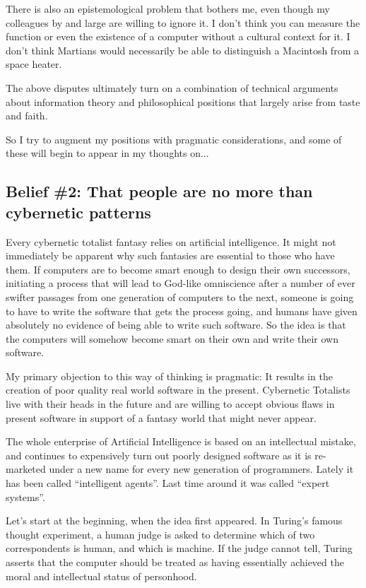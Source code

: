 \documentclass[letterpaper,12pt,english]{sphinxmanual}
\begin{document}
There is also an epistemological problem that bothers me, even though my colleagues by and large are willing to ignore it. I don't think you can measure the function or even the existence of a computer without a cultural context for it. I don't think Martians would necessarily be able to distinguish a Macintosh from a space heater.

The above disputes ultimately turn on a combination of technical arguments about information theory and philosophical positions that largely arise from taste and faith.

So I try to augment my positions with pragmatic considerations, and some of these will begin to appear in my thoughts on...


\subsection{Belief \#2: \textbf{That people are no more than cybernetic patterns}}
\label{lanier:belief-2-that-people-are-no-more-than-cybernetic-patterns}
Every cybernetic totalist fantasy relies on artificial intelligence. It might not immediately be apparent why such fantasies are essential to those who have them. If computers are to become smart enough to design their own successors, initiating a process that will lead to God-like omniscience after a number of ever swifter passages from one generation of computers to the next, someone is going to have to write the software that gets the process going, and humans have given absolutely no evidence of being able to write such software. So the idea is that the computers will somehow become smart on their own and write their own software.

My primary objection to this way of thinking is pragmatic: It results in the creation of poor quality real world software in the present. Cybernetic Totalists live with their heads in the future and are willing to accept obvious flaws in present software in support of a fantasy world that might never appear.

The whole enterprise of Artificial Intelligence is based on an intellectual mistake, and continues to expensively turn out poorly designed software as it is re-marketed under a new name for every new generation of programmers. Lately it has been called ``intelligent agents''. Last time around it was called ``expert systems''.

Let's start at the beginning, when the idea first appeared. In Turing's famous thought experiment, a human judge is asked to determine which of two correspondents is human, and which is machine. If the judge cannot tell, Turing asserts that the computer should be treated as having essentially achieved the moral and intellectual status of personhood.
\end{document}
